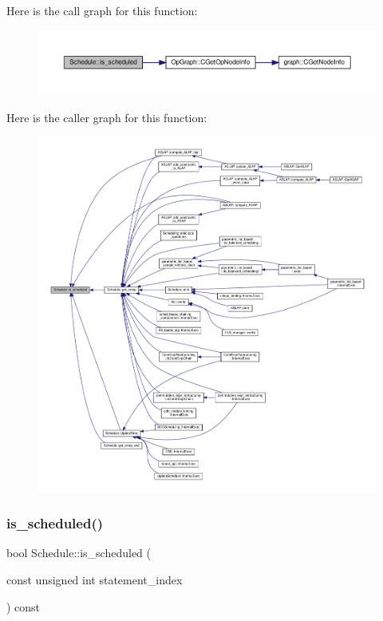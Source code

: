 Here is the call graph for this function\+:
\nopagebreak
\begin{figure}[H]
\begin{center}
\leavevmode
\includegraphics[width=350pt]{df/d61/classSchedule_adeef437f5a2674165df77031551f4f48_cgraph}
\end{center}
\end{figure}
Here is the caller graph for this function\+:
\nopagebreak
\begin{figure}[H]
\begin{center}
\leavevmode
\includegraphics[width=350pt]{df/d61/classSchedule_adeef437f5a2674165df77031551f4f48_icgraph}
\end{center}
\end{figure}
\mbox{\label{classSchedule_a67b5a4dd9ac6f111299d0bcb014f20a0}} 
\subsubsection{\texorpdfstring{is\+\_\+scheduled()}{is\_scheduled()}\hspace{0.1cm}{\footnotesize\ttfamily [2/2]}}
{\footnotesize\ttfamily bool Schedule\+::is\+\_\+scheduled (\begin{DoxyParamCaption}\item[{const unsigned int}]{statement\+\_\+index }\end{DoxyParamCaption}) const}



